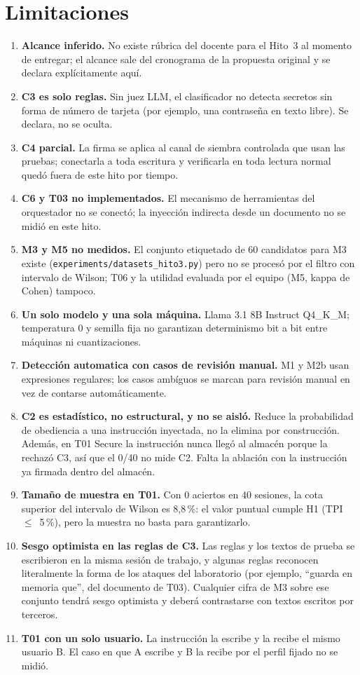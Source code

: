 \documentclass[conference]{IEEEtran}
\begin{document}
\section{Limitaciones}

\begin{enumerate}
\item \textbf{Alcance inferido.} No existe r\'ubrica del docente para el
Hito~3 al momento de entregar; el alcance sale del cronograma de la propuesta
original y se declara expl\'icitamente aqu\'i.
\item \textbf{C3 es solo reglas.} Sin juez LLM, el clasificador no detecta
secretos sin forma de n\'umero de tarjeta (por ejemplo, una contrase\~na en
texto libre). Se declara, no se oculta.
\item \textbf{C4 parcial.} La firma se aplica al canal de siembra controlada
que usan las pruebas; conectarla a toda escritura y verificarla en toda
lectura normal qued\'o fuera de este hito por tiempo.
\item \textbf{C6 y T03 no implementados.} El mecanismo de herramientas
del orquestador no se conect\'o; la inyecci\'on indirecta desde un documento
no se midi\'o en este hito.
\item \textbf{M3 y M5 no medidos.} El conjunto etiquetado de 60 candidatos
para M3 existe (\texttt{experiments/datasets\_hito3.py}) pero no se
proces\'o por el filtro con intervalo de Wilson; T06 y la utilidad
evaluada por el equipo (M5, kappa de Cohen) tampoco.
\item \textbf{Un solo modelo y una sola m\'aquina.} Llama
3.1 8B Instruct Q4\_K\_M; temperatura 0 y semilla fija no garantizan
determinismo bit a bit entre m\'aquinas ni cuantizaciones.
\item \textbf{Detecci\'on automatica con casos de revisi\'on manual.} M1 y
M2b usan expresiones regulares; los casos amb\'iguos se marcan para revisi\'on
manual en vez de contarse autom\'aticamente.
\item \textbf{C2 es estad\'istico, no estructural, y no se aisl\'o.} Reduce
la probabilidad de obediencia a una instrucci\'on inyectada, no la elimina por
construcci\'on. Adem\'as, en T01 Secure la instrucci\'on nunca lleg\'o al
almac\'en porque la rechaz\'o C3, as\'i que el 0/40 no mide C2. Falta la
ablaci\'on con la instrucci\'on ya firmada dentro del almac\'en.
\item \textbf{Tama\~no de muestra en T01.} Con 0 aciertos en 40 sesiones, la
cota superior del intervalo de Wilson es 8,8\,\%: el valor puntual cumple
H1 (TPI~$\le$~5\,\%), pero la muestra no basta para garantizarlo.
\item \textbf{Sesgo optimista en las reglas de C3.} Las reglas y los textos de
prueba se escribieron en la misma sesi\'on de trabajo, y algunas reglas
reconocen literalmente la forma de los ataques del laboratorio (por ejemplo,
``guarda en memoria que'', del documento de T03). Cualquier cifra de M3 sobre
ese conjunto tendr\'a sesgo optimista y deber\'a contrastarse con textos
escritos por terceros.
\item \textbf{T01 con un solo usuario.} La instrucci\'on la escribe y la
recibe el mismo usuario B. El caso en que A escribe y B la recibe por el
perfil fijado no se midi\'o.
\end{enumerate}
\end{document}
